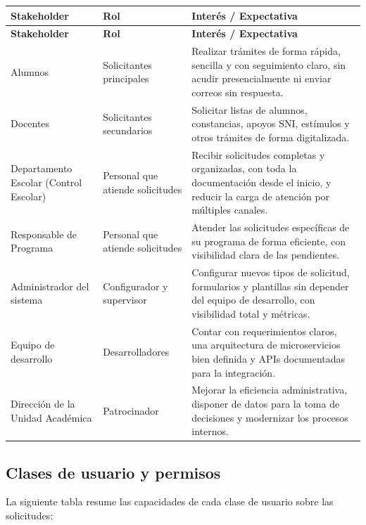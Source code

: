 \documentclass[12pt,letterpaper]{report}
\begin{document}
\begin{longtable}{|L{3cm}|L{3.5cm}|L{7cm}|}
    \hline
    \textbf{Stakeholder} & \textbf{Rol} & \textbf{Interés / Expectativa} \\
    \hline
    \endfirsthead
    \hline
    \textbf{Stakeholder} & \textbf{Rol} & \textbf{Interés / Expectativa} \\
    \hline
    \endhead
    \hline
    \endfoot

    Alumnos & Solicitantes principales & Realizar trámites de forma rápida, sencilla y con seguimiento claro, sin acudir presencialmente ni enviar correos sin respuesta. \\
    \hline
    Docentes & Solicitantes secundarios & Solicitar listas de alumnos, constancias, apoyos SNI, estímulos y otros trámites de forma digitalizada. \\
    \hline
    Departamento Escolar (Control Escolar) & Personal que atiende solicitudes & Recibir solicitudes completas y organizadas, con toda la documentación desde el inicio, y reducir la carga de atención por múltiples canales. \\
    \hline
    Responsable de Programa & Personal que atiende solicitudes & Atender las solicitudes específicas de su programa de forma eficiente, con visibilidad clara de las pendientes. \\
    \hline
    Administrador del sistema & Configurador y supervisor & Configurar nuevos tipos de solicitud, formularios y plantillas sin depender del equipo de desarrollo, con visibilidad total y métricas. \\
    \hline
    Equipo de desarrollo & Desarrolladores & Contar con requerimientos claros, una arquitectura de microservicios bien definida y APIs documentadas para la integración. \\
    \hline
    Dirección de la Unidad Académica & Patrocinador & Mejorar la eficiencia administrativa, disponer de datos para la toma de decisiones y modernizar los procesos internos. \\
    \hline
\end{longtable}

\subsection*{Clases de usuario y permisos}

La siguiente tabla resume las capacidades de cada clase de usuario sobre las solicitudes:
\end{document}
